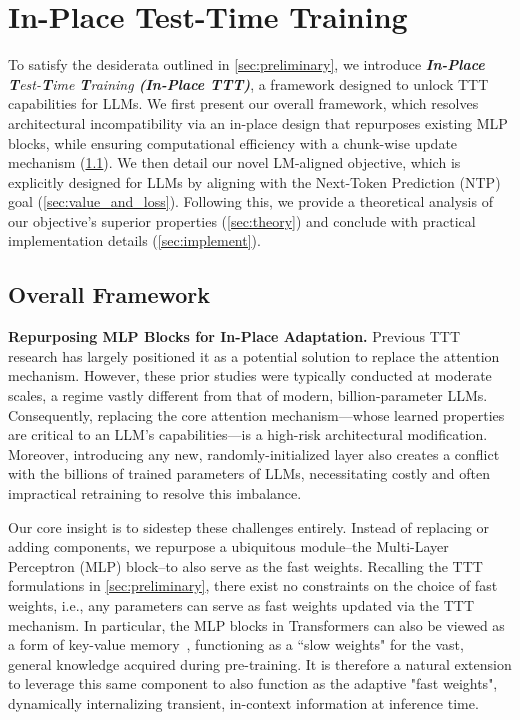 
\section{In-Place Test-Time Training}
\label{sec:method-inplace-ttt}

To satisfy the desiderata outlined in \cref{sec:preliminary}, we introduce \textit{\textbf{In-Place} \textbf{T}est-\textbf{T}ime \textbf{T}raining \textbf{(In-Place TTT)}}, a framework designed to unlock TTT capabilities for LLMs. We first present our overall framework, which resolves architectural incompatibility via an in-place design that repurposes existing MLP blocks, while ensuring computational efficiency with a chunk-wise update mechanism (\cref{sec:inplace_ttt_framework}). We then detail our novel LM-aligned objective, which is explicitly designed for LLMs by aligning with the Next-Token Prediction (NTP) goal (\cref{sec:value_and_loss}). Following this, we provide a theoretical analysis of our objective's superior properties (\cref{sec:theory}) and conclude with practical implementation details (\cref{sec:implement}).

\subsection{Overall Framework}
\label{sec:inplace_ttt_framework}

\textbf{Repurposing MLP Blocks for In-Place Adaptation.} 
Previous TTT research has largely positioned it as a potential solution to replace the attention mechanism. However, these prior studies were typically conducted at moderate scales, a regime vastly different from that of modern, billion-parameter LLMs. Consequently, replacing the core attention mechanism—whose learned properties are critical to an LLM's capabilities—is a high-risk architectural modification. Moreover, introducing any new, randomly-initialized layer also creates a conflict with the billions of trained parameters of LLMs, necessitating costly and often impractical retraining to resolve this imbalance.

Our core insight is to sidestep these challenges entirely. Instead of replacing or adding components, we repurpose a ubiquitous module--the Multi-Layer Perceptron (MLP) block--to also serve as the fast weights. Recalling the TTT formulations in \cref{sec:preliminary}, there exist no constraints on the choice of fast weights, i.e., any parameters can serve as fast weights updated via the TTT mechanism. In particular, the MLP blocks in Transformers can also be viewed as a form of key-value memory~\citep{geva2020transformer}, functioning as a ``slow weights" for the vast, general knowledge acquired during pre-training. It is therefore a natural extension to leverage this same component to also function as the adaptive "fast weights", dynamically internalizing transient, in-context information at inference time.


